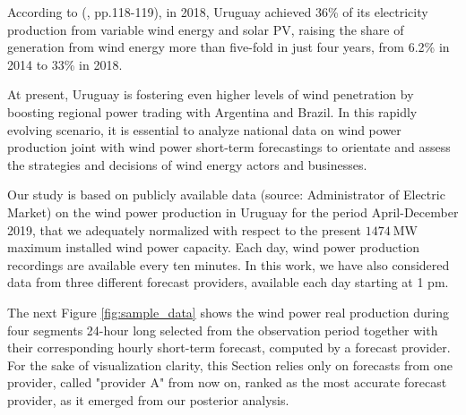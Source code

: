 \documentclass[11pt]{article}
\theoremstyle{definition}
\begin{document}
According to (\cite{ren21}, pp.118-119), in 2018, Uruguay achieved 36\% of its electricity production from variable wind energy and solar PV, raising the share of generation from wind energy more than five-fold in just four years, from 6.2\% in 2014 to 33\% in 2018. 

At present, Uruguay is fostering even higher levels of wind penetration by boosting regional power trading with Argentina and Brazil. 
In this rapidly evolving scenario, it is essential to analyze national data on wind power production joint with wind power short-term forecastings to orientate and assess the strategies and decisions of wind energy actors and businesses. 

Our study is based on publicly available data (source: Administrator of Electric Market) on the wind power production in Uruguay for the period April-December 2019, that we adequately normalized with respect to the present $\SI{1474}{\mega\watt}$ maximum installed wind power capacity. Each day, wind power production recordings are available every ten minutes.  In this work, we have also considered data from three different forecast providers, available each day starting at 1 pm.

The next Figure \ref{fig:sample_data} shows the wind power real production during four segments 24-hour long selected from the observation period together with their corresponding hourly short-term forecast, computed by a forecast provider. For the sake of visualization clarity, this Section relies only on forecasts from one provider, called "provider A" from now on, ranked as the most accurate forecast provider, as it emerged from our posterior analysis. 
\end{document}
